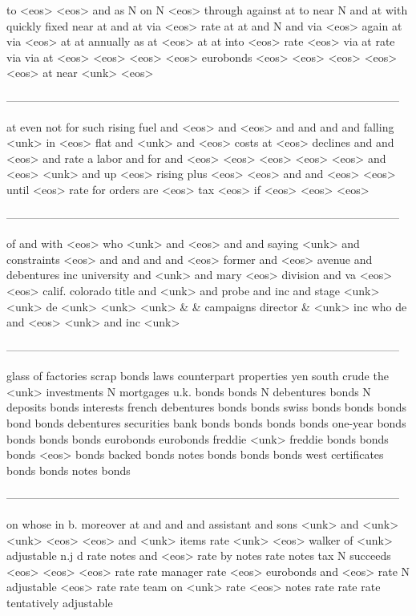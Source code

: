 \begin{enumerate}
to <eos> <eos> and as N on N <eos> through against at to near N and at with quickly fixed near at and at via <eos> rate at at and N and via <eos> again at via <eos> at at annually as at <eos> at at into <eos> rate <eos> via at rate via via at <eos> <eos> <eos> <eos> eurobonds <eos> <eos> <eos> <eos> <eos> at near <unk> <eos>

---------------------------------------------------------------------------------------------------------

at even not for such rising fuel and <eos> and <eos> and and and and falling <unk> in <eos> flat and <unk> and <eos> costs at <eos> declines and and <eos> and rate a labor and for and <eos> <eos> <eos> <eos> <eos> and <eos> <unk> and up <eos> rising plus <eos> <eos> and and <eos> <eos> until <eos> rate for orders are <eos> tax <eos> if <eos> <eos> <eos>

---------------------------------------------------------------------------------------------------------

of and with <eos> who <unk> and <eos> and and saying <unk> and constraints <eos> and and and and <eos> former and <eos> avenue and debentures inc university and <unk> and mary <eos> division and va <eos> <eos> calif. colorado title and <unk> and probe and inc and stage <unk> <unk> de <unk> <unk> <unk> \& \& campaigns director \& <unk> inc who de and <eos> <unk> and inc <unk>

---------------------------------------------------------------------------------------------------------

glass of factories scrap bonds laws counterpart properties yen south crude the <unk> investments N mortgages u.k. bonds bonds N debentures bonds N deposits bonds interests french debentures bonds bonds swiss bonds bonds bonds bond bonds debentures securities bank bonds bonds bonds bonds one-year bonds bonds bonds bonds eurobonds eurobonds freddie <unk> freddie bonds bonds bonds <eos> bonds backed bonds notes bonds bonds bonds west certificates bonds bonds notes bonds

---------------------------------------------------------------------------------------------------------

on whose in b. moreover at and and and assistant and sons <unk> and <unk> <unk> <eos> <eos> and <unk> items rate <unk> <eos> walker of <unk> adjustable n.j d rate notes and <eos> rate by notes rate notes tax N succeeds <eos> <eos> <eos> rate rate manager rate <eos> eurobonds and <eos> rate N adjustable <eos> rate rate team on <unk> rate <eos> notes rate rate rate tentatively adjustable


\end{enumerate}
